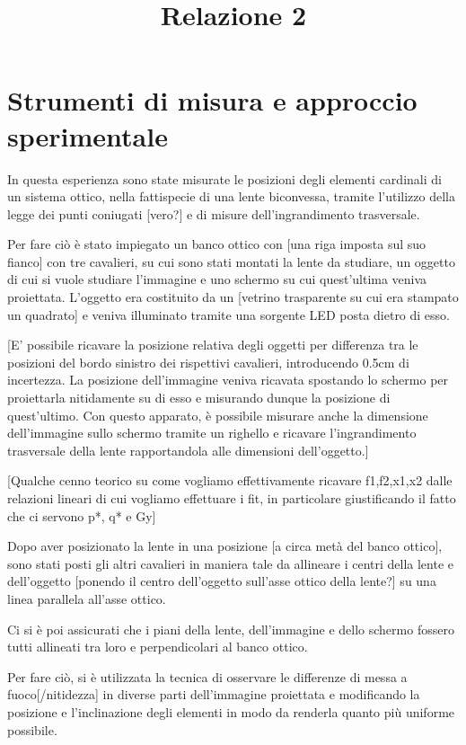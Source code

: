 \documentclass{article}
\title{Relazione 2}
\begin{document}
\maketitle



\section{Strumenti di misura e approccio sperimentale}

In questa esperienza sono state misurate le posizioni degli elementi cardinali di un sistema ottico, nella fattispecie di una lente biconvessa, tramite l'utilizzo della legge dei punti coniugati [vero?] e di misure dell'ingrandimento trasversale.

Per fare ciò è stato impiegato un banco ottico con [una riga imposta sul suo fianco] con tre cavalieri, su cui sono stati montati la lente da studiare, un oggetto di cui si vuole studiare l'immagine e uno schermo su cui quest'ultima veniva proiettata.
L'oggetto era costituito da un [vetrino trasparente su cui era stampato un quadrato] e veniva illuminato tramite una sorgente LED posta dietro di esso.

[E' possibile ricavare la posizione relativa degli oggetti per differenza tra le posizioni del bordo sinistro dei rispettivi cavalieri, introducendo 0.5cm di incertezza. La posizione dell'immagine veniva ricavata spostando lo schermo per proiettarla nitidamente su di esso e misurando dunque la posizione di quest'ultimo. Con questo apparato, è possibile misurare anche la dimensione dell'immagine sullo schermo tramite un righello e ricavare l'ingrandimento trasversale della lente rapportandola alle dimensioni dell'oggetto.]

[Qualche cenno teorico su come vogliamo effettivamente ricavare f1,f2,x1,x2 dalle relazioni lineari di cui vogliamo effettuare i fit, in particolare giustificando il fatto che ci servono p*, q* e Gy]

Dopo aver posizionato la lente in una posizione [a circa metà del banco ottico], sono stati posti gli altri cavalieri in maniera tale da allineare i centri della lente e dell'oggetto [ponendo il centro dell'oggetto sull'asse ottico della lente?] su una linea parallela all'asse ottico.

Ci si è poi assicurati che i piani della lente, dell'immagine e dello schermo fossero tutti allineati tra loro e perpendicolari al banco ottico.

Per fare ciò, si è utilizzata la tecnica di osservare le differenze di messa a fuoco[/nitidezza] in diverse parti dell'immagine proiettata e modificando la posizione e l'inclinazione degli elementi in modo da renderla quanto più uniforme possibile.
\end{document}

